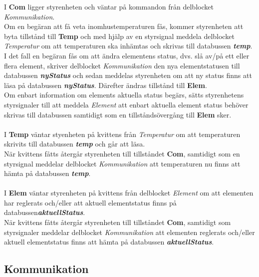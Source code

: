 \documentclass[a4paper]{scrartcl}
\begin{document}
		I \textbf{Com} ligger styrenheten och väntar på kommandon från delblocket \emph{Kommunikation}.
		\\
		Om en begäran att få veta inomhustemperaturen fås, kommer styrenheten att byta tillstånd till \textbf{Temp} och med hjälp av
		en styrsignal meddela delblocket \emph{Temperatur} om att temperaturen ska inhämtas och skrivas till databussen \textbf{\emph{temp}}.
		\\
		I det fall en begäran fås om att ändra elementens status, dvs. slå av/på ett eller flera element, skriver delblocket \emph{Kommunikation}
		den nya elementstatusen till databussen \textbf{\emph{nyStatus}} och sedan meddelas styrenheten om att ny status finns att läsa på databussen \textbf{\emph{nyStatus}}. Därefter
		ändras tillstånd till \textbf{Elem}.
		\\
		Om enbart information om elements aktuella status begärs, sätts styrenhetens styrsignaler till att meddela \emph{Element}
		att enbart aktuella element status behöver skrivas till databussen samtidigt som en tillståndsövergång till \textbf{Elem} sker.
		\\\\
		I \textbf{Temp} väntar styenheten på kvittens från \emph{Temperatur} om att temperaturen skrivits till databussen \textbf{\emph{temp}}
		och går att läsa.
		\\
		När kvittens fåtts återgår styrenheten till tillståndet \textbf{Com}, samtidigt som en styrsignal meddelar delblocket \emph{Kommunikation}
		att temperaturen nu finns att hämta på databussen \textbf{\emph{temp}}.
		\\\\
		I \textbf{Elem} väntar styrenheten på kvittens från delblocket \emph{Element} om att elementen har reglerats och/eller
		att aktuell elementstatus finns på databussen\textbf{\emph{aktuellStatus}}.
		\\
		När kvittens fåtts återgår styrenheten till tillståndet \textbf{Com}, samtidigt som styrsignaler meddelar delblocket \emph{Kommunikation}
		att elementen reglerats och/eller aktuell elementstatus finns att hämta på databussen \textbf{\emph{aktuellStatus}}.
		
	
	\subsection{Kommunikation}
\end{document}
